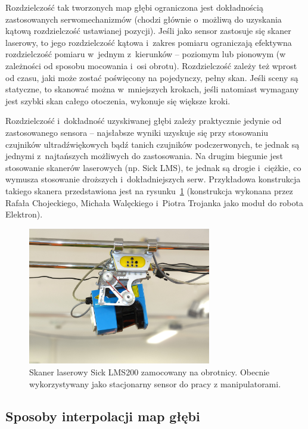 Rozdzielczość tak tworzonych map głębi ograniczona jest dokładnością
zastosowanych serwomechanizmów (chodzi głównie o~możliwą do uzyskania
kątową rozdzielczość ustawianej pozycji). Jeśli jako sensor zastosuje się
skaner laserowy, to jego rozdzielczość kątowa i~zakres pomiaru ograniczają
efektywna rozdzielczość pomiaru w~jednym z~kierunków -- poziomym lub pionowym
(w zależności od sposobu mocowania i~osi obrotu). Rozdzielczość zależy też
wprost od czasu, jaki może zostać poświęcony na pojedynczy, pełny skan. Jeśli
sceny są statyczne, to skanować można w~mniejszych krokach, jeśli natomiast
wymagany jest szybki skan całego otoczenia, wykonuje się większe kroki.

Rozdzielczość i~dokładność uzyskiwanej głębi zależy praktycznie jedynie od
zastosowanego sensora -- najsłabsze wyniki uzyskuje się przy stosowaniu
czujników ultradźwiękowych bądź tanich czujników podczerwonych, te jednak są
jednymi z~najtańszych możliwych do zastosowania. Na drugim biegunie jest
stosowanie skanerów laserowych (np. Sick LMS), te jednak są drogie i~ciężkie, co
wymusza stosowanie droższych i~dokładniejszych serw. Przykładowa konstrukcja
takiego skanera przedstawiona jest na rysunku~\ref{fig:sick_obrotnica}
(konstrukcja wykonana przez Rafała Chojeckiego, Michała Walęckiego i~Piotra
Trojanka jako moduł do robota Elektron).

\begin{figure}[h!]
\centering
\includegraphics[height=6cm]{../../Common/img/sick_obrotnica}
\caption{Skaner laserowy Sick LMS200 zamocowany na obrotnicy. Obecnie wykorzystywany
jako stacjonarny sensor do pracy z manipulatorami.}
\label{fig:sick_obrotnica}
\end{figure}

\subsection{Sposoby interpolacji map głębi}

